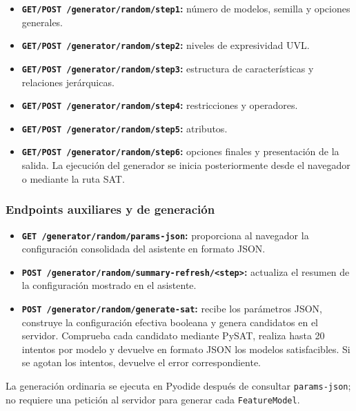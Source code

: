 \begin{itemize}
    \item \textbf{\texttt{GET/POST /generator/random/step1}:} número de
    modelos, semilla y opciones generales.

    \item \textbf{\texttt{GET/POST /generator/random/step2}:} niveles de
    expresividad UVL.

    \item \textbf{\texttt{GET/POST /generator/random/step3}:} estructura de
    características y relaciones jerárquicas.

    \item \textbf{\texttt{GET/POST /generator/random/step4}:} restricciones
    y operadores.

    \item \textbf{\texttt{GET/POST /generator/random/step5}:} atributos.

    \item \textbf{\texttt{GET/POST /generator/random/step6}:} opciones
    finales y presentación de la salida. La ejecución del generador se
    inicia posteriormente desde el navegador o mediante la ruta SAT.
\end{itemize}

\subsubsection*{Endpoints auxiliares y de generación}

\begin{itemize}
    \item \textbf{\texttt{GET /generator/random/params-json}:} proporciona
    al navegador la configuración consolidada del asistente en formato JSON.

    \item \textbf{\texttt{POST /generator/random/summary-refresh/<step>}:}
    actualiza el resumen de la configuración mostrado en el asistente.

    \item \textbf{\texttt{POST /generator/random/generate-sat}:} recibe
    los parámetros JSON, construye la configuración efectiva booleana y
    genera candidatos en el servidor. Comprueba cada candidato mediante PySAT,
    realiza hasta 20 intentos por modelo y devuelve en formato JSON los modelos
    satisfacibles. Si se agotan los intentos, devuelve el error correspondiente.
\end{itemize}

La generación ordinaria se ejecuta en Pyodide después de consultar
\texttt{params-json}; no requiere una petición al servidor para generar
cada \texttt{FeatureModel}.

